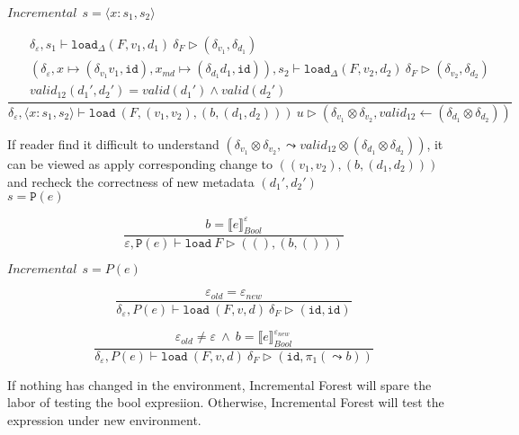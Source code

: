 \documentclass[10pt,twoside,a4paper]{article}
\theoremstyle{theorem}
\theoremstyle{lemma}
\theoremstyle{property}
\theoremstyle{definition}
\theoremstyle{assumption}
\def\fst{\pi_1}
\def\id{\mathtt{id}}
\begin{document}
$\boxed{Incremental~~s = \langle x : s_1, s_2 \rangle}$

\begin{displaymath}
	\frac{\begin{array}{c}
		\delta_\varepsilon, s_1 \vdash \mathtt{load}_\Delta (F,v_1,d_1)~ \delta_F \rhd (\delta_{v_1},\delta_{d_1})\\
		(\delta_\varepsilon, x \mapsto (\delta_{v_1} v_1, \id), x_{md} \mapsto (\delta_{d_1} d_1, \id)), s_2 \vdash \mathtt{load}_\Delta (F,v_2,d_2)~ \delta_F \rhd (\delta_{v_2},\delta_{d_2})\\
		valid_{12}({d_1}',{d_2}') = valid({d_1}') \wedge valid({d_2}')
	\end{array}}
	{\delta_\varepsilon, \langle x:s_1,s_2 \rangle \vdash \mathtt{load}~ (F,(v_1,v_2),(b,(d_1,d_2)))~ u \rhd (\delta_{v_1} \otimes \delta_{v_2},valid_{12} \leftarrow (\delta_{d_1} \otimes \delta_{d_2})) }
\end{displaymath}

If reader find it difficult to understand $(\delta_{v_1} \otimes \delta_{v_2},\leadsto valid_{12} \otimes (\delta_{d_1} \otimes \delta_{d_2}))$, it can be viewed as apply corresponding change to $((v_1,v_2),(b,(d_1,d_2)))$ and recheck the correctness of new metadata $({d_1}', {d_2}')$\\

$\boxed{s = \mathtt{P}(e)}$

\begin{displaymath}
	\frac
	{b = \llbracket e \rrbracket^{\varepsilon}_{Bool}}
	{\varepsilon, \mathtt{P}(e) \vdash \mathtt{load}~F \rhd ((),(b,()))}
\end{displaymath}

$\boxed{Incremental~~s = P(e)}$

\begin{displaymath}
	\frac{ \varepsilon_{old} = \varepsilon_{new}}
	{\delta_\varepsilon, P(e) \vdash \mathtt{load}~ (F,v,d) ~\delta_F \rhd (\id, \id)}
\end{displaymath}

\begin{displaymath}
	\frac{ \varepsilon_{old} \not= \varepsilon ~\wedge~  b = \llbracket e \rrbracket^{\varepsilon_{new}}_{Bool}}
	{\delta_\varepsilon, P(e) \vdash \mathtt{load}~ (F,v,d) ~\delta_F \rhd (\mathtt{id},\fst(\leadsto b))}
\end{displaymath}

If nothing has changed in the environment, Incremental Forest will spare the labor of testing the bool expresiion. Otherwise, Incremental Forest will test the expression under new environment.\\
\end{document}
